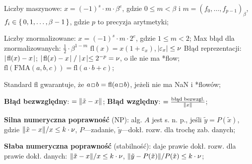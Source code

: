 
\entry
Liczby maszynowe: $x=(-1)^s \cdot m \cdot \beta^e$, gdzie $0\leq m < \beta$ i $m=(f_0, \ldots, f_{p-1})_\beta$, $f_i\in\set{0,1,\ldots,\beta-1}$, gdzie $p$ to precyzja arytmetyki;

\entry
Liczby znormalizowane: $x=(-1)^s\cdot m \cdot 2^e$, gdzie $1\leq m < 2$;
\entry
Max błąd dla znormalizowanych: $ \frac{1}{2} \cdot \beta^{1 - m}$
\entry
$\mathrm{fl}(x) = x(1+\varepsilon_x)$, $\abs{\varepsilon_x}\leq \nu$
\entry
Błąd reprezentacji: $\mid\! \mathrm{fl}(x) - x\! \mid$;
\entry
$\mid\! \mathrm{fl}(x) - x\! \mid / \mid\! x\! \mid\leq 2^{-p}=\nu$, o ile nie ma *flow;
\entry
$\mathrm{fl}(\mathrm{FMA}(a,b,c)) = \mathrm{fl}(a \cdot b + c)$;

\entry
Standard fl gwarantuje, że $a\, \Hsquare\, b = \mathrm{fl}(a \,\Hsquare\, b)$, jeżeli nie ma NaN i *flowów;


\entry
\textbf{Błąd bezwzględny}:
$=\|\tilde{x} - x\|$;
\entry
\textbf{Błąd względny}:
$=\frac{\text{błąd bezwzgl.}}{\|x\|}$;

\entry
\textbf{Silna numeryczna poprawność} (NP):
alg. $A$ jest s. n. p.,
jeśli $\tilde{y} = P(\tilde{x})$,
gdzie $\|\tilde{x}-x\| / x\leq k\cdot\nu$,
$P$---zadanie,
$\tilde{y}$---dokł. rozw. dla trochę zab. danych;

\entry
\textbf{Słaba numeryczna poprawność} (stabilność):
daje prawie dokł. rozw. dla prawie dokł. danych:
$\|\tilde{x}-x\| / x\leq k\cdot\nu$, $\|\tilde{y}-P(\tilde{x})\| / P(\tilde{x})\leq k\cdot\nu$;
